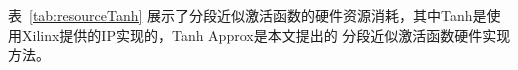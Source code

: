 表~\ref{tab:resourceTanh} 展示了分段近似激活函数的硬件资源消耗，其中Tanh是使用Xilinx提供的IP实现的，Tanh Approx是本文提出的
分段近似激活函数硬件实现方法。



%
